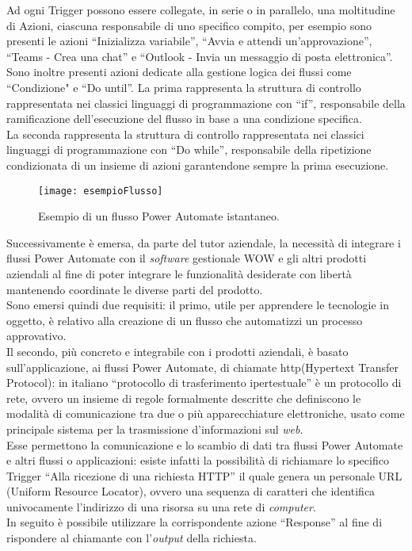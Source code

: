 \noindent Ad ogni Trigger possono essere collegate, in serie o in parallelo, una moltitudine di Azioni, ciascuna responsabile di uno specifico compito, per esempio sono presenti le azioni “Inizializza variabile”, “Avvia e attendi un'approvazione”, “Teams - Crea una chat” e “Outlook - Invia un messaggio di posta elettronica”.\\
Sono inoltre presenti azioni dedicate alla gestione logica dei flussi come “Condizione" e “Do until”. La prima rappresenta la struttura di controllo rappresentata nei classici linguaggi di programmazione con “if”, responsabile della ramificazione dell'esecuzione del flusso in base a una condizione specifica.\\
La seconda rappresenta la struttura di controllo rappresentata nei classici linguaggi di programmazione con “Do while”, responsabile della ripetizione condizionata di un insieme di azioni garantendone sempre la prima esecuzione.
\begin{figure}[htbp] 
    \centering 
    \texttt{[image: esempioFlusso]} 
    \caption{Esempio di un flusso Power Automate istantaneo.}
    \label{fig:esempioFlusso}
\end{figure}
\noindent Successivamente è emersa, da parte del tutor aziendale, la necessità di integrare i flussi Power Automate con il \emph{software} gestionale WOW e gli altri prodotti aziendali al fine di poter integrare le funzionalità desiderate con libertà mantenendo coordinate le diverse parti del prodotto.\\
Sono emersi quindi due requisiti: il primo, utile per apprendere le tecnologie in oggetto, è relativo alla creazione di un flusso che automatizzi un processo approvativo.\\
Il secondo, più concreto e integrabile con i prodotti aziendali, è basato sull'applicazione, ai flussi Power Automate, di chiamate \gls{http}(Hypertext Transfer Protocol): in italiano “protocollo di trasferimento ipertestuale” è un protocollo di rete, ovvero un insieme di regole formalmente descritte che definiscono le modalità di comunicazione tra due o più apparecchiature elettroniche, usato come principale sistema per la trasmissione d'informazioni sul \emph{web}.\\
Esse permettono la comunicazione e lo scambio di dati tra flussi Power Automate e altri flussi o applicazioni: esiste infatti la possibilità di richiamare lo specifico Trigger “Alla ricezione di una richiesta HTTP” il quale genera un personale URL (Uniform Resource Locator), ovvero una sequenza di caratteri che identifica univocamente l'indirizzo di una risorsa su una rete di \emph{computer}.\\
In seguito è possibile utilizzare la corrispondente azione “Response” al fine di rispondere al chiamante con l'\emph{output} della richiesta.
